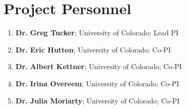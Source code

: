 \section*{Project Personnel}

\begin{enumerate}

\item \textbf{Dr. Greg Tucker}; University of Colorado; Lead PI
\item \textbf{Dr. Eric Hutton}; University of Colorado; Co-PI
\item \textbf{Dr. Albert Kettner}; University of Colorado; Co-PI
\item \textbf{Dr. Irina Overeem}; University of Colorado; Co-PI
\item \textbf{Dr. Julia Moriarty}; University of Colorado; Co-PI

\end{enumerate}
